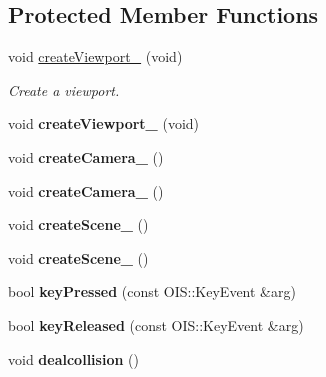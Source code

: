 \subsection*{Protected Member Functions}
\begin{DoxyCompactItemize}
\item 
void \hyperlink{class_basic_tutorial__00_a6d4684502f2f7b2cf628a975d7750d8e}{create\+Viewport\+\_} (void)
\begin{DoxyCompactList}\small\item\em Create a viewport. \end{DoxyCompactList}\item 
\mbox{\label{class_basic_tutorial__00_a2801a2f0d91d80b471da48344d2ccccf}} 
void {\bfseries create\+Viewport\+\_} (void)
\item 
\mbox{\label{class_basic_tutorial__00_a3479c50dbf8dc06a7ea77014eb94c6e7}} 
void {\bfseries create\+Camera\+\_} ()
\item 
\mbox{\label{class_basic_tutorial__00_a8745a127adeb69fa769f832fd41412c0}} 
void {\bfseries create\+Camera\+\_} ()
\item 
\mbox{\label{class_basic_tutorial__00_aa84173e509858146cbfb98274c1ef56e}} 
void {\bfseries create\+Scene\+\_} ()
\item 
\mbox{\label{class_basic_tutorial__00_aad14e1ca565797c4b7dcff31bc0e1494}} 
void {\bfseries create\+Scene\+\_} ()
\item 
\mbox{\label{class_basic_tutorial__00_adc1a0b32d78b1980b3ee51a1b1e1e69b}} 
bool {\bfseries key\+Pressed} (const O\+I\+S\+::\+Key\+Event \&arg)
\item 
\mbox{\label{class_basic_tutorial__00_aacca7a0a2a5a0e0d007b9c6c30b4941b}} 
bool {\bfseries key\+Released} (const O\+I\+S\+::\+Key\+Event \&arg)
\item 
\mbox{\label{class_basic_tutorial__00_a21c308bde23ea7864f6e0d1dde59fab4}} 
void {\bfseries dealcollision} ()
\item 

\end{DoxyCompactItemize}
